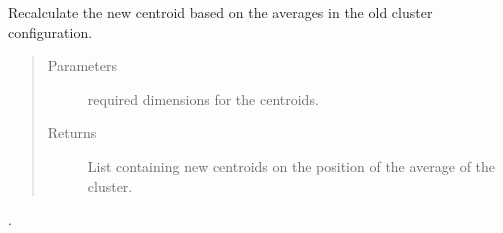 \documentclass[letterpaper,10pt,english]{sphinxmanual}
\begin{document}
\begin{fulllineitems}
\label{\detokenize{clustering:clustering.calculateCentroids}}
\sphinxAtStartPar
Recalculate the new centroid based on the averages in the old cluster configuration.
\begin{quote}\begin{description}
\item[{Parameters}] \leavevmode
\sphinxAtStartPar
{} \textendash{} required dimensions for the centroids.

\item[{Returns}] \leavevmode
\sphinxAtStartPar
List containing new centroids on the position of the average of the cluster.

\end{description}\end{quote}

\end{fulllineitems}


\begin{fulllineitems}
\label{\detokenize{clustering:clustering.contractEdge}}
\sphinxAtStartPar
.

\end{fulllineitems}

\end{document}

